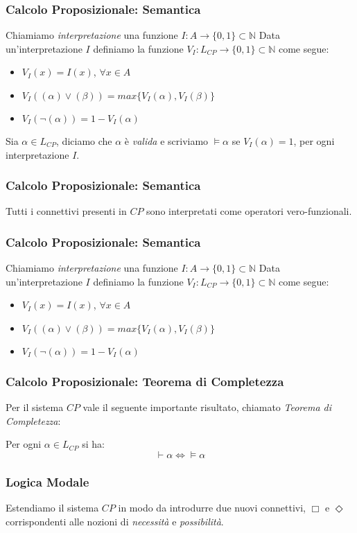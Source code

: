 \documentclass[notheorem]{beamer}
\begin{document}
\begin{frame}
\frametitle{Calcolo Proposizionale: Semantica}
Chiamiamo \emph{interpretazione} una funzione $I : A \to \{0, 1\} \subset \mathbb{N}$
Data un'interpretazione $I$ definiamo la funzione $V_I : L_{CP} \to \{0, 1\} \subset \mathbb{N}$
come segue:
\begin{itemize}
\item $V_I(x) = I(x)$, $\forall x \in A$
\item $V_I((\alpha) \lor (\beta)) = max\{V_I(\alpha), V_I(\beta)\}$
\item $V_I(\neg (\alpha)) = 1 - V_I(\alpha)$
\end{itemize}

Sia $\alpha \in L_{CP}$, diciamo che $\alpha$ è \emph{valida} e scriviamo $\vDash \alpha$ se
$V_I(\alpha) = 1$, per ogni interpretazione $I$.
\end{frame}

\begin{frame}
\frametitle{Calcolo Proposizionale: Semantica}
Tutti i connettivi presenti in $CP$ sono interpretati come operatori vero-funzionali.
\end{frame}

\begin{frame}
\frametitle{Calcolo Proposizionale: Semantica}
Chiamiamo \emph{interpretazione} una funzione $I : A \to \{0, 1\} \subset \mathbb{N}$
Data un'interpretazione $I$ definiamo la funzione $V_I : L_{CP} \to \{0, 1\} \subset \mathbb{N}$
come segue:
\begin{itemize}
\item $V_I(x) = I(x)$, $\forall x \in A$
\item $V_I((\alpha) \lor (\beta)) = max\{V_I(\alpha), V_I(\beta)\}$
\item $V_I(\neg (\alpha)) = 1 - V_I(\alpha)$
\end{itemize}
\end{frame}

\begin{frame}
\frametitle{Calcolo Proposizionale: Teorema di Completezza}
Per il sistema $CP$ vale il seguente importante risultato, chiamato
\emph{Teorema di Completezza}:

Per ogni $\alpha \in L_{CP}$ si ha:
$$\vdash \alpha \Leftrightarrow \vDash \alpha$$
\end{frame}

\begin{frame}
\frametitle{Logica Modale}
Estendiamo il sistema $CP$ in modo da introdurre due nuovi connettivi, $\Box$
e $\Diamond$ corrispondenti alle nozioni di \emph{necessità} e \emph{possibilità}.
\end{frame}
\end{document}
